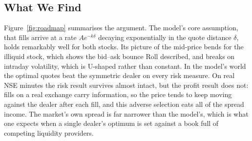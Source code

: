 \subsection{What We Find}

Figure~\ref{fig:roadmap} summarises the argument. The model's core assumption, that fills
arrive at a rate $Ae^{-k\delta}$ decaying exponentially in the quote distance $\delta$, holds
remarkably well for both stocks. Its picture of the mid-price bends for the illiquid stock,
which shows the bid--ask bounce Roll described, and breaks on intraday volatility, which is
U-shaped rather than constant. In the model's world the optimal quotes beat the symmetric
dealer on every risk measure. On real NSE minutes the risk result survives almost intact, but
the profit result does not: fills on a real exchange carry information, so the price tends to
keep moving against the dealer after each fill, and this adverse selection eats all of the
spread income. The market's own spread is far narrower than the model's, which is what one
expects when a single dealer's optimum is set against a book full of competing liquidity
providers.

